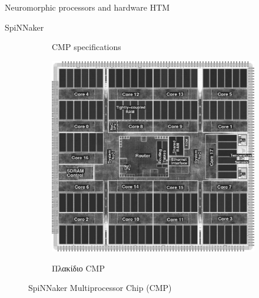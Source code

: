\documentclass[a4paper,11pt]{article}
\begin{document}
\begin{section}{Neuromorphic processors and hardware HTM}
\begin{subsection}{SpiNNaker}
\begin{figure} [H]
\begin{subfigure}{0.5\columnwidth}
        \caption{CMP specifications}\label{fig:CMP-specs}
      \end{subfigure}%
      \begin{subfigure}{0.5\columnwidth}
        \centering
        {\includegraphics[width=0.9\columnwidth,clip=true]{pics/CMP.jpg}}
        \caption{Πλακίδιο CMP}\label{fig:CMP-die}
      \end{subfigure}
      \caption{SpiNNaker Multiprocessor Chip (CMP)}
    \end{figure}


\end{subsection}
\end{section}
\end{document}

